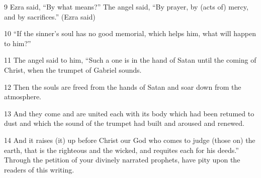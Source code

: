 \par 9 Ezra said, “By what means?” The angel said, “By prayer, by (acts of) mercy, and by sacrifices.” (Ezra said)

\par 10 “If the sinner's soul has no good memorial, which helps him, what will happen to him?”

\par 11 The angel said to him, “Such a one is in the hand of Satan until the coming of Christ, when the trumpet of Gabriel sounds.

\par 12 Then the souls are freed from the hands of Satan and soar down from the atmosphere.

\par 13 And they come and are united each with its body which had been retumed to dust and which the sound of the trumpet had built and aroused and renewed.

\par 14 And it raises (it) up before Christ our God who comes to judge (those on) the earth, that is the righteous and the wicked, and requites each for his deeds.” Through the petition of your divinely narrated prophets, have pity upon the readers of this writing.

